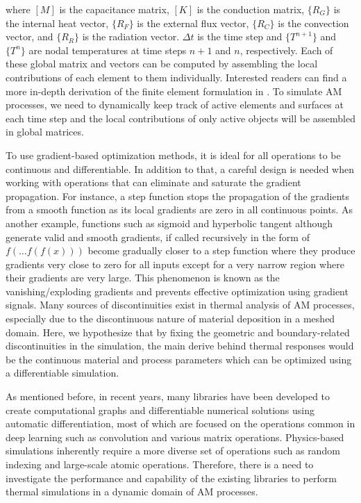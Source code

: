 \documentclass{article}
\begin{document}
where $[M]$ is the capacitance matrix, $[K]$ is the conduction matrix, $\{R_G\}$ is the internal heat vector, $\{R_F \}$ is the external flux vector, $\{R_C \}$  is the convection vector, and $\{R_R \}$  is the radiation vector. $\Delta t$ is the time step and $\{T^{n+1} \}$ and $\{T^n \}$ are nodal temperatures at time steps $n+1$ and $n$, respectively. Each of these global matrix and vectors can be computed by assembling the local contributions of each element to them individually. Interested readers can find a more in-depth derivation of the finite element formulation in \citep{12}. To simulate AM processes, we need to dynamically keep track of active elements and surfaces at each time step and the local contributions of only active objects will be assembled in global matrices.

To use gradient-based optimization methods, it is ideal for all operations to be continuous and differentiable. In addition to that, a careful design is needed when working with operations that can eliminate and saturate the gradient propagation. For instance, a step function stops the propagation of the gradients from a smooth function as its local gradients are zero in all continuous points. As another example, functions such as sigmoid and hyperbolic tangent although generate valid and smooth gradients, if called recursively in the form of $f(…f(f(x)))$ become gradually closer to a step function where they produce gradients very close to zero for all inputs except for a very narrow region where their gradients are very large. This phenomenon is known as the vanishing/exploding gradients and prevents effective optimization using gradient signals. Many sources of discontinuities exist in thermal analysis of AM processes, especially due to the discontinuous nature of material deposition in a meshed domain. Here, we hypothesize that by fixing the geometric and boundary-related discontinuities in the simulation, the main derive behind thermal responses would be the continuous material and process parameters which can be optimized using a differentiable simulation.

As mentioned before, in recent years, many libraries have been developed to create computational graphs and differentiable numerical solutions using automatic differentiation, most of which are focused on the operations common in deep learning such as convolution and various matrix operations. Physics-based simulations inherently require a more diverse set of operations such as random indexing and large-scale atomic operations. Therefore, there is a need to investigate the performance and capability of the existing libraries to perform thermal simulations in a dynamic domain of AM processes.
\end{document}
